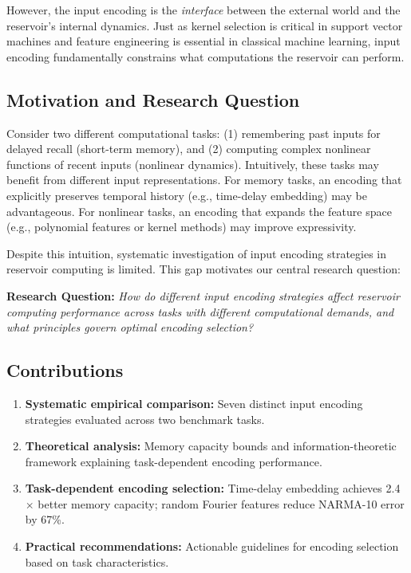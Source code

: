 \documentclass[11pt]{article}
\begin{document}
However, the input encoding is the \emph{interface} between the external world and the reservoir's internal dynamics. Just as kernel selection is critical in support vector machines and feature engineering is essential in classical machine learning, input encoding fundamentally constrains what computations the reservoir can perform.

\subsection{Motivation and Research Question}

Consider two different computational tasks: (1) remembering past inputs for delayed recall (short-term memory), and (2) computing complex nonlinear functions of recent inputs (nonlinear dynamics). Intuitively, these tasks may benefit from different input representations. For memory tasks, an encoding that explicitly preserves temporal history (e.g., time-delay embedding) may be advantageous. For nonlinear tasks, an encoding that expands the feature space (e.g., polynomial features or kernel methods) may improve expressivity.

Despite this intuition, systematic investigation of input encoding strategies in reservoir computing is limited. This gap motivates our central research question:

\vspace{0.3cm}
\noindent\textbf{Research Question:} \emph{How do different input encoding strategies affect reservoir computing performance across tasks with different computational demands, and what principles govern optimal encoding selection?}
\vspace{0.3cm}

\subsection{Contributions}

\begin{enumerate}
    \item \textbf{Systematic empirical comparison:} Seven distinct input encoding strategies evaluated across two benchmark tasks.
    
    \item \textbf{Theoretical analysis:} Memory capacity bounds and information-theoretic framework explaining task-dependent encoding performance.
    
    \item \textbf{Task-dependent encoding selection:} Time-delay embedding achieves 2.4$\times$ better memory capacity; random Fourier features reduce NARMA-10 error by 67\%.
    
    \item \textbf{Practical recommendations:} Actionable guidelines for encoding selection based on task characteristics.
\end{enumerate}
\end{document}
